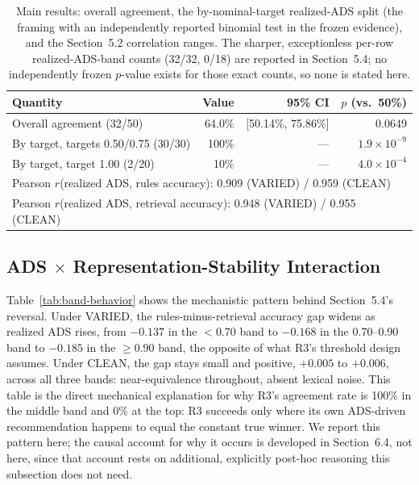 \documentclass[11pt]{article}
\begin{document}
\begin{table}[htbp]
\centering
\caption{Main results: overall agreement, the by-nominal-target realized-ADS
split (the framing with an independently reported binomial test in the
frozen evidence), and the Section~5.2 correlation ranges. The sharper,
exceptionless per-row realized-ADS-band counts (32/32, 0/18) are reported in
Section~5.4; no independently frozen $p$-value exists for those exact counts,
so none is stated here.}
\label{tab:main-results}
\begin{tabular}{lrrr}
\toprule
Quantity & Value & 95\% CI & $p$ (vs.\ 50\%) \\
\midrule
Overall agreement (32/50) & 64.0\% & [50.14\%, 75.86\%] & 0.0649 \\
By target, targets 0.50/0.75 (30/30) & 100\% & --- & $1.9\times10^{-9}$ \\
By target, target 1.00 (2/20) & 10\% & --- & $4.0\times10^{-4}$ \\
\midrule
\multicolumn{4}{l}{Pearson $r$(realized ADS, rules accuracy): 0.909 (VARIED) / 0.959 (CLEAN)} \\
\multicolumn{4}{l}{Pearson $r$(realized ADS, retrieval accuracy): 0.948 (VARIED) / 0.955 (CLEAN)} \\
\bottomrule
\end{tabular}
\end{table}

\subsection{ADS $\times$ Representation-Stability Interaction}
\label{sec:results-interaction}

Table~\ref{tab:band-behavior} shows the mechanistic pattern behind Section~5.4's
reversal. Under VARIED, the rules-minus-retrieval accuracy gap widens as
realized ADS rises, from $-0.137$ in the $<0.70$ band to $-0.168$ in the
0.70--0.90 band to $-0.185$ in the $\geq0.90$ band, the opposite of what
R3's threshold design assumes. Under CLEAN, the gap stays small and
positive, $+0.005$ to $+0.006$, across all three bands: near-equivalence
throughout, absent lexical noise. This table is the direct mechanical
explanation for why R3's agreement rate is 100\% in the middle band and 0\%
at the top: R3 succeeds only where its own ADS-driven recommendation happens
to equal the constant true winner. We report this pattern here; the causal
account for why it occurs is developed in Section~6.4, not here, since that
account rests on additional, explicitly post-hoc reasoning this subsection
does not need.
\end{document}
